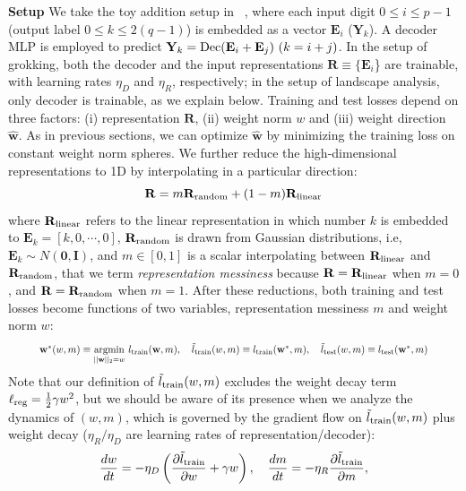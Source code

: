\documentclass{article} %
\newcommand{\zm}[1]{{\color{black!100!blue} #1}}
\newcommand{\mat}[1]{\mathbf{#1}}
\begin{document}
{\bf Setup} We take the toy addition setup in ~\citep{liu2022towards}, where \zm{each input digit $0\leq i\leq p-1$ (output label $0\leq k\leq 2(q-1)$) is embedded as a vector $\mat{E}_i$ ($\mat{Y}_k$). A decoder MLP is employed to predict $\mat{Y}_k={\rm Dec}(\mat{E}_i+\mat{E}_j)\ (k=i+j)$. In the setup of grokking, both the decoder and the input representations $\mat{R}\equiv\{\mat{E}_i$\} are trainable, with learning rates $\eta_D$ and $\eta_R$, respectively; in the setup of landscape analysis, only decoder is trainable, as we explain below.} Training and test losses depend on three factors: (i) representation $\mat{R}$, (ii) weight norm $w$ and (iii) weight direction $\hat{\mat{w}}$. As in previous sections, we can optimize $\hat{\mat{w}}$ by minimizing the training loss  on constant weight norm spheres. We further reduce the high-dimensional representations to 1D by interpolating in a particular direction:\begin{equation}\label{eq:arithmetic_m}
    \mat{R} = m\mat{R}_{\rm random} + (1-m)\mat{R}_{\rm linear}
\end{equation}
where $\mat{R}_{\rm linear}$ refers to the linear representation in which number $k$ is embedded to $\mat{E}_k=[k,0,\cdots,0]$, $\mat{R}_{\rm random}$ is drawn from Gaussian distributions, i.e, $\mat{E}_k\sim N(\mat{0},\mat{I})$, and $m\in[0,1]$ is a scalar interpolating between $\mat{R}_{\rm linear}$ and $\mat{R}_{\rm random}$, that we term {\it representation messiness} because $\mat{R}=\mat{R}_{\rm linear}$ when $m=0$, and $\mat{R}=\mat{R}_{\rm random}$ when $m=1$. After these reductions, both training and test losses become functions of two variables, representation messiness $m$ and weight norm $w$:
\begin{equation}\label{eq:wm}
    \resizebox{0.9\textwidth}{!}{$\mat{w}^*(w,m) \equiv \underset{||\mat{w}||_2=w}{\rm argmin}\ l_{\rm train}(\mat{w}, m),\quad \tilde{l}_{\rm train}(w, m)\equiv l_{\rm train}(\mat{w}^*,m), \quad \tilde{l}_{\rm test}(w, m)\equiv l_{\rm test}(\mat{w}^*,m)$}
\end{equation}
Note that our definition of $\tilde{l}_{\rm train}(w,m)$  excludes the weight decay term $\ell_{\rm reg}=\frac{1}{2}\gamma w^2$, but we should be aware of its presence when we analyze the dynamics of $(w,m)$, which is governed by the gradient flow on $\tilde{l}_{\rm train}(w,m)$ plus weight decay ($\eta_R/\eta_D$ are learning rates of representation/decoder): 
\begin{equation}\label{eq:wm_dynamcis}
    \frac{dw}{dt} = -\eta_D\left(\frac{\partial\tilde{l}_{\rm train}}{\partial w} + \gamma w\right),\quad  \frac{dm}{dt} = -\eta_R\frac{\partial\tilde{l}_{\rm train}}{\partial m},
\end{equation}
\end{document}
